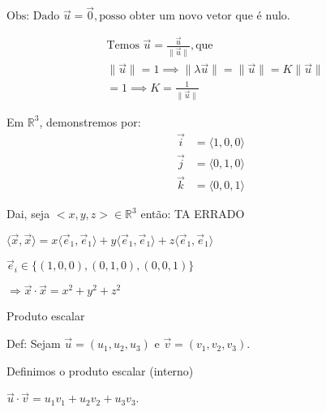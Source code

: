 $\text{Obs: Dado } \vec{u} = \vec{0}, \text{posso obter um novo vetor que é nulo.}$

\begin{align*}
    &\text{Temos } \vec{u} = \frac{\vec{u}}{\|\vec{u}\|}, \text{que} \\
    &\|\vec{u}\| = 1 \implies \|\lambda \vec{u}\| = \|\vec{u}\| = K \|\vec{u}\| \\
    &= 1 \implies K = \frac{1}{\|\vec{u}\|}
\end{align*}


Em $\mathbb{R}^3$, demonstremos por:
\begin{align*}
    \vec{i} &= \langle 1, 0, 0 \rangle \\
    \vec{j} &= \langle 0, 1, 0 \rangle \\
    \vec{k} &= \langle 0, 0, 1 \rangle
\end{align*}

Dai, seja $<x, y, z> \in \mathbb{R}^3$ então: TA ERRADO

$\langle \vec{x}, \vec{x} \rangle = x\langle \vec{e}_1, \vec{e}_1 \rangle + y\langle \vec{e}_1, \vec{e}_1 \rangle + z\langle \vec{e}_1, \vec{e}_1 \rangle$

$\vec{e}_i \in \{(1, 0, 0), (0, 1, 0), (0, 0, 1)\}$

$\Rightarrow \vec{x} \cdot \vec{x} = x^2 + y^2 + z^2$

Produto escalar

Def: Sejam $\vec{u} = (u_1, u_2, u_3)$ e $\vec{v} = (v_1, v_2, v_3)$. 

Definimos o produto escalar (interno)

$\vec{u} \cdot \vec{v} = u_1v_1 + u_2v_2 + u_3v_3$.
    
